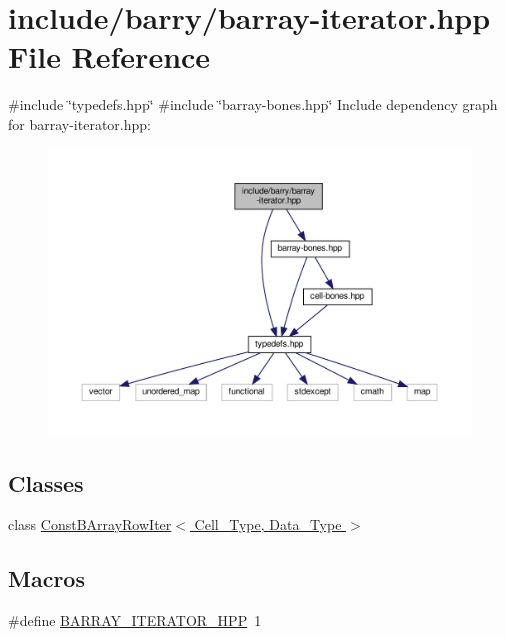 \hypertarget{barray-iterator_8hpp}{}\section{include/barry/barray-\/iterator.hpp File Reference}
\label{barray-iterator_8hpp}
{\ttfamily \#include \char`\"{}typedefs.\+hpp\char`\"{}}\newline
{\ttfamily \#include \char`\"{}barray-\/bones.\+hpp\char`\"{}}\newline
Include dependency graph for barray-\/iterator.hpp\+:
\nopagebreak
\begin{figure}[H]
\begin{center}
\leavevmode
\includegraphics[width=350pt]{barray-iterator_8hpp__incl}
\end{center}
\end{figure}
\subsection*{Classes}
\begin{DoxyCompactItemize}
\item 
class \hyperlink{class_const_b_array_row_iter}{Const\+B\+Array\+Row\+Iter$<$ Cell\+\_\+\+Type, Data\+\_\+\+Type $>$}
\end{DoxyCompactItemize}
\subsection*{Macros}
\begin{DoxyCompactItemize}
\item 
\#define \hyperlink{barray-iterator_8hpp_af7d28058e98dd1797def3cd230abe121}{B\+A\+R\+R\+A\+Y\+\_\+\+I\+T\+E\+R\+A\+T\+O\+R\+\_\+\+H\+PP}~1
\end{DoxyCompactItemize}


